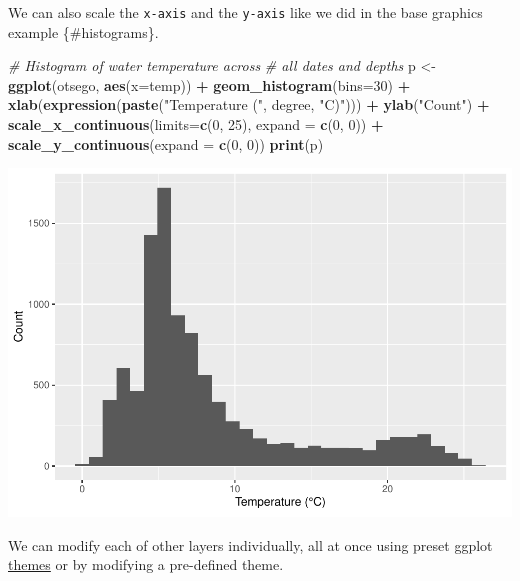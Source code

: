 \documentclass[
]{book}
\newenvironment{Shaded}{\begin{snugshade}}{\end{snugshade}}
\newcommand{\CommentTok}[1]{\textcolor[rgb]{0.56,0.35,0.01}{\textit{#1}}}
\newcommand{\DataTypeTok}[1]{\textcolor[rgb]{0.13,0.29,0.53}{#1}}
\newcommand{\DecValTok}[1]{\textcolor[rgb]{0.00,0.00,0.81}{#1}}
\newcommand{\KeywordTok}[1]{\textcolor[rgb]{0.13,0.29,0.53}{\textbf{#1}}}
\newcommand{\NormalTok}[1]{#1}
\newcommand{\OperatorTok}[1]{\textcolor[rgb]{0.81,0.36,0.00}{\textbf{#1}}}
\newcommand{\StringTok}[1]{\textcolor[rgb]{0.31,0.60,0.02}{#1}}
\begin{document}
We can also scale the \texttt{x-axis} and the \texttt{y-axis} like we did in the base graphics example \{\#histograms\}.

\begin{Shaded}
\begin{Highlighting}[]
\CommentTok{# Histogram of water temperature across }
\CommentTok{# all dates and depths}
\NormalTok{p <-}\StringTok{ }\KeywordTok{ggplot}\NormalTok{(otsego, }\KeywordTok{aes}\NormalTok{(}\DataTypeTok{x=}\NormalTok{temp)) }\OperatorTok{+}\StringTok{ }
\StringTok{  }\KeywordTok{geom_histogram}\NormalTok{(}\DataTypeTok{bins=}\DecValTok{30}\NormalTok{) }\OperatorTok{+}\StringTok{ }
\StringTok{  }\KeywordTok{xlab}\NormalTok{(}\KeywordTok{expression}\NormalTok{(}\KeywordTok{paste}\NormalTok{(}\StringTok{"Temperature ("}\NormalTok{, degree, }\StringTok{"C)"}\NormalTok{))) }\OperatorTok{+}
\StringTok{  }\KeywordTok{ylab}\NormalTok{(}\StringTok{"Count"}\NormalTok{) }\OperatorTok{+}
\StringTok{  }\KeywordTok{scale_x_continuous}\NormalTok{(}\DataTypeTok{limits=}\KeywordTok{c}\NormalTok{(}\DecValTok{0}\NormalTok{, }\DecValTok{25}\NormalTok{), }\DataTypeTok{expand =} \KeywordTok{c}\NormalTok{(}\DecValTok{0}\NormalTok{, }\DecValTok{0}\NormalTok{)) }\OperatorTok{+}\StringTok{ }
\StringTok{  }\KeywordTok{scale_y_continuous}\NormalTok{(}\DataTypeTok{expand =} \KeywordTok{c}\NormalTok{(}\DecValTok{0}\NormalTok{, }\DecValTok{0}\NormalTok{))}
\KeywordTok{print}\NormalTok{(p)}
\end{Highlighting}
\end{Shaded}

\includegraphics{worstr_files/figure-latex/unnamed-chunk-100-1.pdf}

We can modify each of other layers individually, all at once using preset ggplot \href{http://www.sthda.com/english/wiki/ggplot2-title-main-axis-and-legend-titles}{themes} or by modifying a pre-defined theme.
\end{document}
